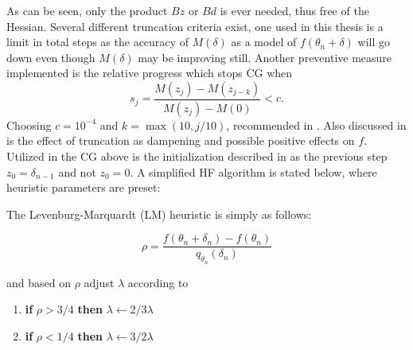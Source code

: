 As can be seen, only the product $Bz$ or $Bd$ is ever needed, thus free of the Hessian. Several different truncation criteria exist, one used in this thesis is a limit in total steps as the accuracy of $M(\delta)$ as a model of $f(\theta_n + \delta)$ will go down even though $M(\delta)$ may be improving still. Another preventive measure implemented is the relative progress which stops CG when \[s_j = \frac{M(z_j) - M(z_{j-k})}{M(z_j) - M(0)} < c.\]  Choosing $c = 10^{-4}$ and $k= \max (10, j/10)$, recommended in \cite{suts}. Also discussed in \textcite{Martens2012} is the effect of truncation as dampening and possible positive effects on $f$. Utilized in the CG above is the initialization described in \cite{Martens2012} as the previous step $z_0 = \delta_{n-1}$ and not $z_0 = 0$. A simplified HF algorithm is stated below, where heuristic parameters are preset:


The Levenburg-Marquardt (LM) heuristic is simply as follows:

\[ \rho = \frac{f(\theta_n + \delta_n) - f(\theta_n)}{q_{\theta_n} (\delta_n)}\]

\noindent
and based on $\rho$ adjust $\lambda$ according to

\begin{enumerate}
    \item \textbf{if} $\rho > 3/4 $ \textbf{then} $\lambda\gets 2/3 \lambda$
    \item \textbf{if} $\rho<1/4$ \textbf{then} $\lambda \gets 3/2\lambda$
\end{enumerate} 

